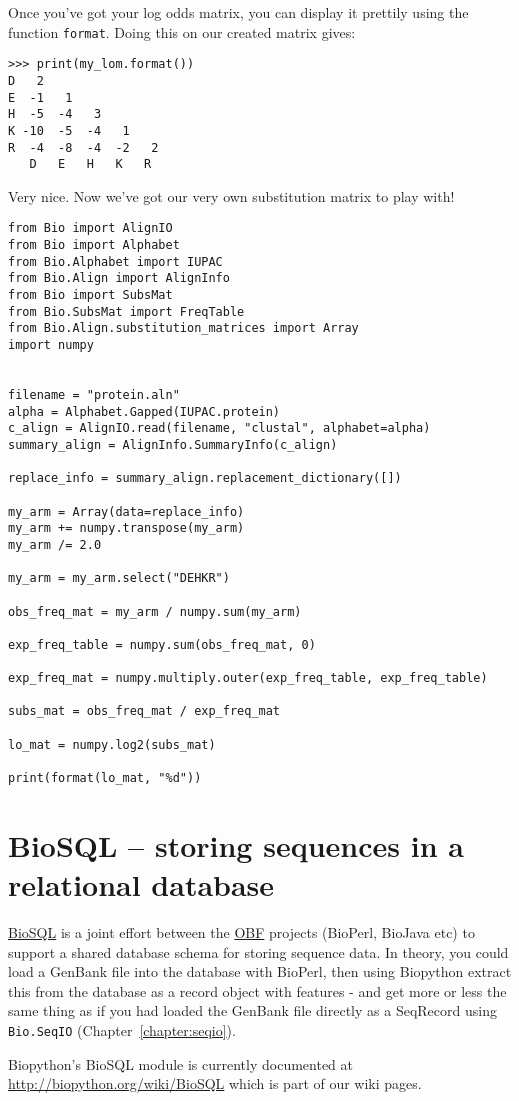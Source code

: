 Once you've got your log odds matrix, you can display it prettily
using the function \verb|format|. Doing this on our created matrix
gives:

\begin{verbatim}
>>> print(my_lom.format())
D   2
E  -1   1
H  -5  -4   3
K -10  -5  -4   1
R  -4  -8  -4  -2   2
   D   E   H   K   R
\end{verbatim}

Very nice. Now we've got our very own substitution matrix to play with!

\begin{verbatim}
from Bio import AlignIO
from Bio import Alphabet
from Bio.Alphabet import IUPAC
from Bio.Align import AlignInfo
from Bio import SubsMat
from Bio.SubsMat import FreqTable
from Bio.Align.substitution_matrices import Array
import numpy


filename = "protein.aln"
alpha = Alphabet.Gapped(IUPAC.protein)
c_align = AlignIO.read(filename, "clustal", alphabet=alpha)
summary_align = AlignInfo.SummaryInfo(c_align)

replace_info = summary_align.replacement_dictionary([])

my_arm = Array(data=replace_info)
my_arm += numpy.transpose(my_arm)
my_arm /= 2.0

my_arm = my_arm.select("DEHKR")

obs_freq_mat = my_arm / numpy.sum(my_arm)

exp_freq_table = numpy.sum(obs_freq_mat, 0)

exp_freq_mat = numpy.multiply.outer(exp_freq_table, exp_freq_table)

subs_mat = obs_freq_mat / exp_freq_mat

lo_mat = numpy.log2(subs_mat)

print(format(lo_mat, "%d"))
\end{verbatim}


\section{BioSQL -- storing sequences in a relational database}
\label{sec:BioSQL}
\href{https://www.biosql.org/}{BioSQL} is a joint effort between the
\href{https://www.open-bio.org/wiki/Main_Page}{OBF} projects (BioPerl, BioJava etc) to support a
shared database schema for storing sequence data. In theory, you could load a
GenBank file into the database with BioPerl, then using Biopython extract this
from the database as a record object with features - and get more or less the same
thing as if you had loaded the GenBank file directly as a SeqRecord using
\verb|Bio.SeqIO| (Chapter~\ref{chapter:seqio}).

Biopython's BioSQL module is currently documented at
\url{http://biopython.org/wiki/BioSQL} which is part of our wiki pages.
